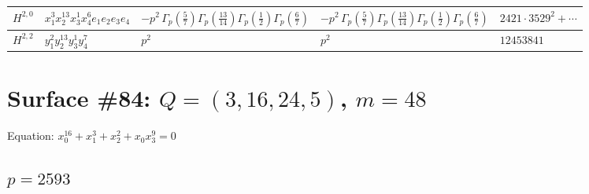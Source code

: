 \documentclass[11pt]{article}
\begin{document}
\begin{table}[ht]
{\begin{tabular}{@{}lllll@{}}
\midrule
$H^{2,0}$ & $x_{1}^{3} x_{2}^{13} x_{3}^{1} x_{4}^{6}  e_{1} e_{2} e_{3} e_{4}$ & $- p^{2} \, \Gamma_p \left( \frac{5}{7} \right) \Gamma_p \left( \frac{13}{14} \right) \Gamma_p \left( \frac{1}{2} \right) \Gamma_p \left( \frac{6}{7} \right)$ & $- p^{2} \, \Gamma_p \left( \frac{5}{7} \right) \Gamma_p \left( \frac{13}{14} \right) \Gamma_p \left( \frac{1}{2} \right) \Gamma_p \left( \frac{6}{7} \right)$ & $2421{\cdot}3529^{2}{+}\cdots$ \\
\midrule
$H^{2,2}$ & $y_{1}^{2} y_{2}^{13} y_{3}^{1} y_{4}^{7}$ & $p^{2} \,$ & $p^{2} \,$ & $12453841$ \\
\bottomrule
\end{tabular}
}
\renewcommand{\arraystretch}{1.0}
\end{table}

\newpage

\section*{Surface \#84: $Q=(3, 16, 24, 5)$, $m=48$}

Equation: $x_0^{16} + x_1^{3} + x_2^{2} + x_0 x_3^{9} = 0$

\subsection*{$p = 2593$}
\end{document}
